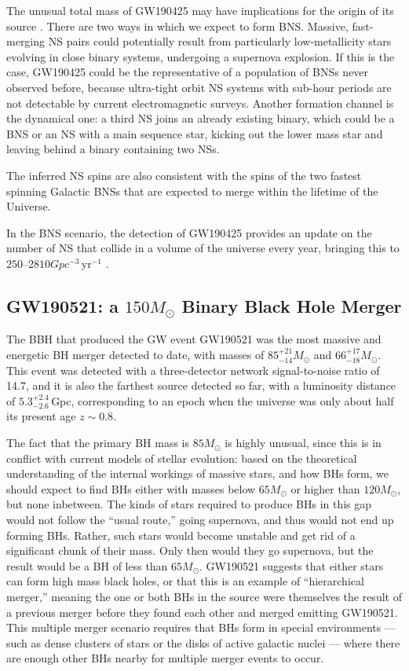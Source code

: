 \documentclass[binding=0.6cm, LaM]{sapthesis}
\begin{document}
	The unusual total mass of GW190425 may have implications for the origin of its source \cite{148}.
	There are two ways in which we expect to form BNS. 
	Massive, fast-merging NS pairs could potentially result from 
	particularly low-metallicity stars evolving in close binary systems, undergoing a supernova explosion.
	If this is the case, GW190425 could be the representative of a population of BNSs never observed before, 
	because ultra-tight orbit NS systems with sub-hour periods are not detectable by current electromagnetic surveys.
	Another formation channel is the dynamical one: a third NS joins an already existing binary, 
	which could be a BNS or an NS with a main sequence star, kicking out the
	lower mass star and leaving behind a binary containing two NSs.

	The inferred NS spins are also consistent with the spins of the two fastest 
	spinning Galactic BNSs that are expected to merge within the lifetime of the Universe.

	In the BNS scenario, the detection of GW190425 provides an update 
	on the number of NS that collide in a volume of the universe every year, bringing this to $250–2810 Gpc^{-3}\,$yr$^{-1}$ \cite{62}.

\subsection{GW190521: a $150M_\odot$ Binary Black Hole Merger}
	The BBH that produced the GW event GW190521 was the most massive and energetic BH merger detected to date, 
	with masses of $85^{+21}_{-14}M_{\odot}$ and  $66^{+17}_{-18}M_{\odot}$.
	This event was detected with a three-detector network signal-to-noise ratio of 14.7, 
	and it is also the farthest source detected so far, with a luminosity distance of $5.3^{+2.4}_{-2.6}\,$Gpc,
	corresponding to an epoch when the universe was only about half its present age $z \sim 0.8$.

	The fact that the primary BH mass is $85 M_{\odot}$ is highly unusual, 
	since this is in conflict with current models of stellar evolution:
	based on the theoretical understanding of the internal workings of massive stars, 
	and how BHs form, we should expect to find BHs
	either with masses below $65M_\odot$ or higher than $120M_{\odot}$, but none inbetween.
	The kinds of stars required to produce BHs in this gap would not follow the ``usual route,''
	going supernova, and thus would not end up forming BHs. 
	Rather, such stars would become unstable and get rid of a significant chunk of their mass. 
	Only then would they go supernova, but the result would be a BH of less than $65 M_\odot$.
	GW190521 suggests that either stars can form high mass black holes, 
	or that this is an example of ``hierarchical merger,'' 
	meaning the one or both BHs in the source were themselves the result of 
	a previous merger before they found each other and merged emitting GW190521.
	This multiple merger scenario requires that BHs form in special environments
        --- such as dense clusters of stars or the disks of active galactic nuclei --- 
	where there are enough other BHs nearby for multiple merger events to occur.
\end{document}
